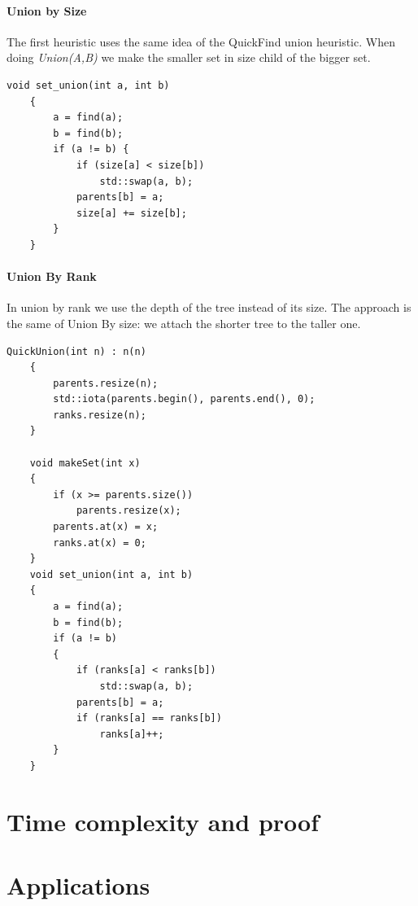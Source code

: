 \documentclass{article}
\begin{document}
\paragraph{Union by Size}
The first heuristic uses the same idea of the QuickFind union heuristic. When doing \emph{Union(A,B)}
we make the smaller set in size child of the bigger set.
\begin{lstlisting}[caption=Union by size implementation, label=quu]
    void set_union(int a, int b)
    {
        a = find(a);
        b = find(b);
        if (a != b) {
            if (size[a] < size[b])
                std::swap(a, b);
            parents[b] = a;
            size[a] += size[b];
        }
    }

\end{lstlisting}
\paragraph{Union By Rank} In union by rank we use the depth of the tree instead
of its size. The approach is the same of Union By size: we attach the shorter tree
to the taller one.
\begin{lstlisting}[caption=QuickUnion using Union by Rank]
    QuickUnion(int n) : n(n)
    {
        parents.resize(n);
        std::iota(parents.begin(), parents.end(), 0);
        ranks.resize(n);
    }

    void makeSet(int x)
    {
        if (x >= parents.size())
            parents.resize(x);
        parents.at(x) = x;
        ranks.at(x) = 0;
    }
    void set_union(int a, int b)
    {
        a = find(a);
        b = find(b);
        if (a != b)
        {
            if (ranks[a] < ranks[b])
                std::swap(a, b);
            parents[b] = a;
            if (ranks[a] == ranks[b])
                ranks[a]++;
        }
    }
\end{lstlisting}
\section{Time complexity and proof}
\section{Applications}


\end{document}
